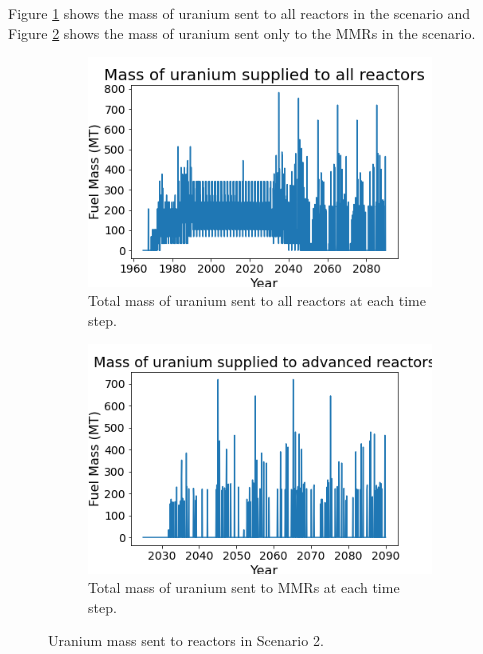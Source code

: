 Figure \ref{fig:totalfuel_2} shows the mass of uranium sent to all 
reactors in the scenario and Figure \ref{fig:haleu_2} shows the mass 
of uranium sent only to the \glspl{MMR} in the scenario.  

\begin{figure}
    \centering
    \begin{subfigure}{0.4\textwidth}
        \centering
        \includegraphics[scale=0.3]{figures/fuelsupply_scenarios_2.png}
        \caption{Total mass of uranium sent to all reactors at each time step.}
        \label{fig:totalfuel_2}
    \end{subfigure}
    \begin{subfigure}{0.4\textwidth}
        \centering
        \includegraphics[scale=0.3]{figures/advancedRX_fuelsupply_scenarios_2.png}
        \caption{Total mass of uranium sent to \glspl{MMR} at each time step.}
        \label{fig:haleu_2}
    \end{subfigure}
    \caption{Uranium mass sent to reactors in Scenario 2.}
    \label{fig:fuel_2}
\end{figure}

